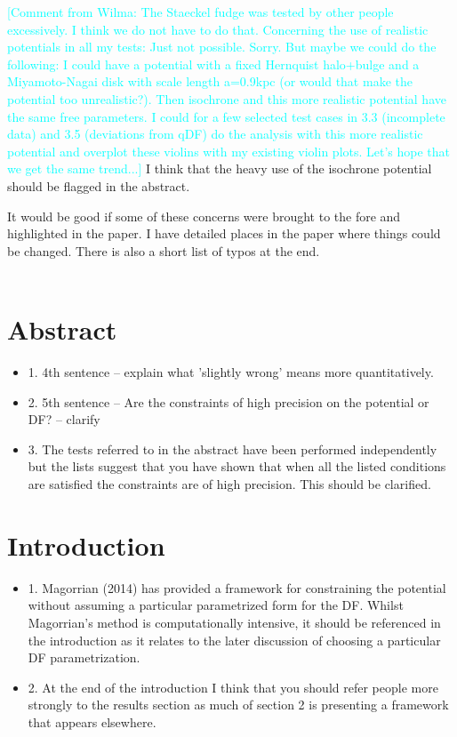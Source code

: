 \documentclass[10pt,a4paper]{article}
\newcommand{\HW}[1]{\textcolor{Cyan}{#1}}
\begin{document}
\begin{itemize}
\HW{[Comment from Wilma: The Staeckel fudge was tested by other people excessively. I think we do not have to do that. Concerning the use of realistic potentials in all my tests: Just not possible. Sorry. But maybe we could do the following: I could have a potential with a fixed Hernquist halo+bulge and a Miyamoto-Nagai disk with scale length a=0.9kpc (or would that make the potential too unrealistic?). Then isochrone and this more realistic potential have the same free parameters. I could for a few selected test cases in 3.3 (incomplete data) and 3.5 (deviations from qDF) do the analysis with this more realistic potential and overplot these violins with my existing violin plots. Let's hope that we get the same trend...]} I think
that the heavy use of the isochrone potential should be flagged in the abstract.
\end{itemize}

It would be good if some of these concerns were brought to the fore and highlighted
in the paper. I have detailed places in the paper where things could be changed.
There is also a short list of typos at the end.\\\\


\section{Abstract}
\begin{itemize}
\item 1. 4th sentence -- explain what 'slightly wrong' means more quantitatively.
\item 2. 5th sentence -- Are the constraints of high precision on the potential or DF? -- clarify
\item 3. The tests referred to in the abstract have been performed independently but the lists suggest that you have shown that when all the listed conditions are satisfied the constraints are of high precision. This should be clarified.
\end{itemize}

\section{Introduction}
\begin{itemize}
\item 1. Magorrian (2014) has provided a framework for constraining the potential without assuming a particular parametrized form for the DF. Whilst Magorrian's method is computationally intensive, it should be referenced in the introduction as it relates to the later discussion of choosing a particular DF parametrization.
\item 2. At the end of the introduction I think that you should refer people more strongly to the results section as much of section 2 is presenting a framework that appears elsewhere.
\end{itemize}
\end{document}
